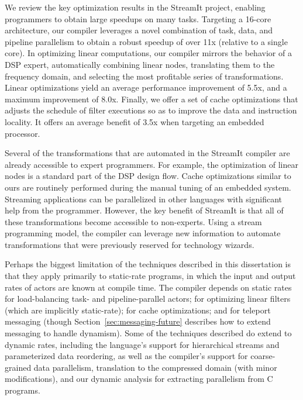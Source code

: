 \item We review the key optimization results in the StreamIt project, 
enabling programmers to obtain large speedups on many tasks.
Targeting a 16-core architecture, our compiler leverages a novel
combination of task, data, and pipeline parallelism to obtain a robust
speedup of over 11x (relative to a single core).  In optimizing linear
computations, our compiler mirrors the behavior of a DSP expert,
automatically combining linear nodes, translating them to the
frequency domain, and selecting the most profitable series of
transformations.  Linear optimizations yield an average performance
improvement of 5.5x, and a maximum improvement of 8.0x.  Finally, we
offer a set of cache optimizations that adjusts the schedule of filter
executions so as to improve the data and instruction locality.  It
offers an average benefit of 3.5x when targeting an embedded
processor.

\myend

Several of the transformations that are automated in the StreamIt
compiler are already accessible to expert programmers.  For example,
the optimization of linear nodes is a standard part of the DSP design
flow.  Cache optimizations similar to ours are routinely performed
during the manual tuning of an embedded system.  Streaming
applications can be parallelized in other languages with significant
help from the programmer.  However, the key benefit of StreamIt is
that all of these transformations become accessible to non-experts.
Using a stream programming model, the compiler can leverage new
information to automate transformations that were previously reserved
for technology wizards.

Perhaps the biggest limitation of the techniques described in this
dissertation is that they apply primarily to static-rate programs, in
which the input and output rates of actors are known at compile time.
The compiler depends on static rates for load-balancing task- and
pipeline-parallel actors; for optimizing linear filters (which are
implicitly static-rate); for cache optimizations; and for teleport
messaging (though Section~\ref{sec:messaging-future} describes how to
extend messaging to handle dynamism).  Some of the techniques
described do extend to dynamic rates, including the language's support
for hierarchical streams and parameterized data reordering, as well as
the compiler's support for coarse-grained data parallelism,
translation to the compressed domain (with minor modifications), and
our dynamic analysis for extracting parallelism from C programs.

